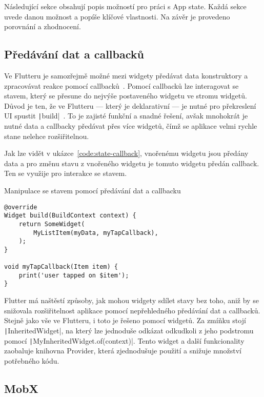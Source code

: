 Následující sekce obsahují popis možností pro práci s App state.
Každá sekce uvede danou možnost a popíše klíčové vlastnosti.
Na závěr je provedeno porovnání a zhodnocení.

\subsection{Předávání dat a callbacků}
\label{sec:data-callback-transfer}

Ve Flutteru je samozřejmě možné mezi widgety předávat data konstruktory
a zpracovávat reakce pomocí callbacků~\cite{flutter_state_mgmt_simple}. 
Pomocí callbacků lze interagovat se stavem,
který se přesune do nejvýše postaveného widgetu ve stromu widgetů.
Důvod je ten,
že ve Flutteru
--- který je deklarativní ---
je nutné pro překreslení UI spustit
\texttt|build|~\cite{flutter_state_mgmt_simple}.
To je zajisté funkční a snadné řešení,
avšak mnohokrát je nutné data a callbacky předávat přes více widgetů,
čímž se aplikace velmi rychle stane nelehce rozšiřitelnou.

Jak lze vidět v ukázce~\ref{code:state-callback},
vnořenému widgetu jsou předány data
a pro změnu stavu z vnořeného widgetu je tomuto widgetu předán callback.
Ten se využije pro interakce se stavem.

\begin{listing}
    \caption{Manipulace se stavem pomocí předávání dat a callbacku
\cite{flutter_state_mgmt_simple}}
    \label{code:state-callback}
    \begin{verbatim}
@override
Widget build(BuildContext context) {
    return SomeWidget(
        MyListItem(myData, myTapCallback),
    );
}

void myTapCallback(Item item) {
    print('user tapped on $item');
}
    \end{verbatim}
\end{listing}

Flutter má naštěstí způsoby,
jak mohou widgety sdílet stavy bez toho,
aniž by se snižovala rozšiřitelnost aplikace pomocí nepřehledného předávání
dat a callbacků.
Stejně jako vše ve Flutteru,
i toto je řešeno pomocí widgetů.
Za zmíňku stojí \texttt|InheritedWidget|,
na který lze jednoduše odkázat odkudkoli z jeho podstromu pomocí
\texttt|MyInheritedWidget.of(context)|.
Tento widget a další funkcionality zaobaluje knihovna Provider,
která zjednodušuje použití a snižuje množství potřebného
kódu.~\cite{flutter_state_mgmt_simple}

\subsection{MobX}

